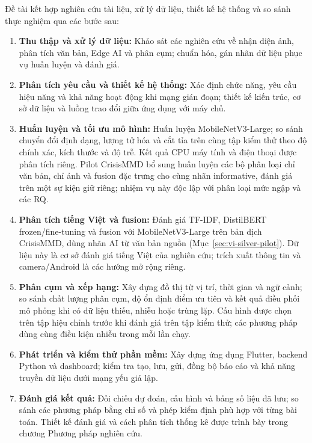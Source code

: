 
Đề tài kết hợp nghiên cứu tài liệu, xử lý dữ liệu, thiết kế hệ thống và so sánh thực nghiệm qua các bước sau:

\begin{enumerate}
    \item \textbf{Thu thập và xử lý dữ liệu:} Khảo sát các nghiên cứu về nhận diện ảnh, phân tích văn bản, Edge AI và phân cụm; chuẩn hóa, gán nhãn dữ liệu phục vụ huấn luyện và đánh giá.
    \item \textbf{Phân tích yêu cầu và thiết kế hệ thống:} Xác định chức năng, yêu cầu hiệu năng và khả năng hoạt động khi mạng gián đoạn; thiết kế kiến trúc, cơ sở dữ liệu và luồng trao đổi giữa ứng dụng với máy chủ.
    \item \textbf{Huấn luyện và tối ưu mô hình:} Huấn luyện MobileNetV3-Large; so sánh chuyển đổi định dạng, lượng tử hóa và cắt tỉa trên cùng tập kiểm thử theo độ chính xác, kích thước và độ trễ. Kết quả CPU máy tính và điện thoại được phân tích riêng. Pilot CrisisMMD bổ sung huấn luyện các bộ phân loại chỉ văn bản, chỉ ảnh và fusion đặc trưng cho cùng nhãn informative, đánh giá trên một sự kiện giữ riêng; nhiệm vụ này độc lập với phân loại mức ngập và các RQ.
    \item \textbf{Phân tích tiếng Việt và fusion:} Đánh giá TF-IDF, DistilBERT frozen/fine-tuning và fusion với MobileNetV3-Large trên bản dịch CrisisMMD, dùng nhãn AI từ văn bản nguồn (Mục~\ref{sec:vi-silver-pilot}). Dữ liệu này là cơ sở đánh giá tiếng Việt của nghiên cứu; trích xuất thông tin và camera/Android là các hướng mở rộng riêng.
    \item \textbf{Phân cụm và xếp hạng:} Xây dựng đồ thị từ vị trí, thời gian và ngữ cảnh; so sánh chất lượng phân cụm, độ ổn định điểm ưu tiên và kết quả điều phối mô phỏng khi có dữ liệu thiếu, nhiễu hoặc trùng lặp. Cấu hình được chọn trên tập hiệu chỉnh trước khi đánh giá trên tập kiểm thử; các phương pháp dùng cùng điều kiện nhiễu trong mỗi lần chạy.
    \item \textbf{Phát triển và kiểm thử phần mềm:} Xây dựng ứng dụng Flutter, backend Python và dashboard; kiểm tra tạo, lưu, gửi, đồng bộ báo cáo và khả năng truyền dữ liệu dưới mạng yếu giả lập.
    \item \textbf{Đánh giá kết quả:} Đối chiếu dự đoán, cấu hình và bảng số liệu đã lưu; so sánh các phương pháp bằng chỉ số và phép kiểm định phù hợp với từng bài toán. Thiết kế đánh giá và cách phân tích thống kê được trình bày trong chương Phương pháp nghiên cứu.
\end{enumerate}

